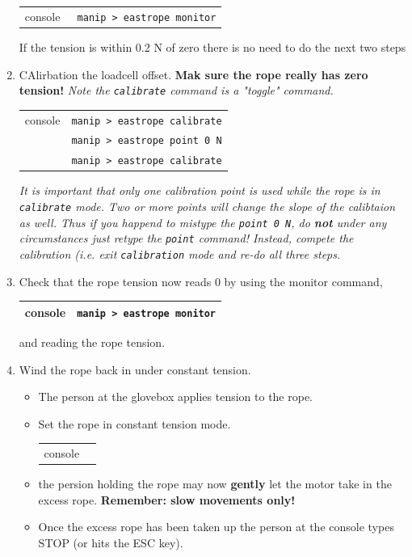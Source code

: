 \documentclass[11pt]{article}
\begin{document}
\begin{enumerate}
\begin{center}
\begin{tabular}{|c|c|}
console & \verb+ manip > eastrope monitor+ \\
\end{tabular}
\end{center}
If the tension is within 0.2 N of zero there is no need to do the next two steps
\item \CheckBox[name=cesr5]{} CAlirbation the loadcell offset. {\bf Mak sure the rope really has zero tension!} {\it Note the \verb+calibrate+ command is a "toggle" command.}
	\begin{tabular}{|c|c|}
	\hline
	console & \verb+manip > eastrope calibrate+ \\
	              & \verb+manip > eastrope point 0 N+ \\
	              & \verb+manip > eastrope calibrate+ \\
	           \hline
	\end{tabular}
{\it It is important that only one calibration point is used while the rope is in \verb+calibrate+ mode. Two or more points will change the slope of the calibtaion as well. Thus if you happend to mistype the \verb+point 0 N+, do {\bf not} under any circumstances just retype the \verb+point+ command! Instead, compete the calibration (i.e. exit \verb+calibration+ mode and re-do all three steps.}
\item \CheckBox[name=cesr6]{} Check that the rope tension now reads 0 by using the monitor command,
\begin{tabular}{|c|c|}
\hline
console & \verb+manip > eastrope monitor+ \\
\hline
\end{tabular}
and reading the rope tension.
\item \CheckBox[name=cesr7]{} Wind the rope back in under constant tension.
\begin{itemize}
\item The person at the glovebox applies tension to the rope.
\item Set the rope in constant tension mode.
\begin{tabular}{|c|c|}
console & \verb+manip > eastrope tension 15 \\
\end{tabular}
\item the persion holding the rope may now {\bf gently} let the motor take in the excess rope. {\bf Remember: slow movements only!}
\item Once the excess rope has been taken up the person at the console types STOP (or hits the ESC key).
\end{itemize}
\end{enumerate}
\end{document}
